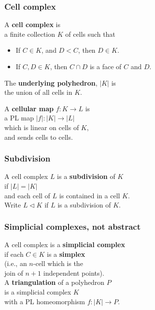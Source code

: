 \documentclass[14pt]{beamer}
\newcommand{\subdivided}{\triangleleft}
\begin{document}
\begin{frame}
\frametitle{Cell complex}

 A \textbf{cell complex} is \\
  a finite collection $K$ of cells such that
  \begin{itemize}
  \item If $C \in K$, and $D < C$, then $D \in K$.
  \item If $C, D \in K$, then $C \cap D$ is a face of $C$ and $D$.
  \end{itemize}

  \vfill\pause
  The \textbf{underlying polyhedron}, $|K|$ is \\
  the union of all cells in $K$.

  \vfill\pause

  A \textbf{cellular map} $f : K \to L$ is \\
  a PL map $|f| : |K| \to |L|$ \\
  which is linear on cells of $K$, \\
  and sends cells to cells.

\end{frame}

\begin{frame}
\frametitle{Subdivision}

 A cell complex $L$ is a \textbf{subdivision} of $K$ \\
  if $|L| = |K|$ \\
  and each cell of $L$ is contained in a cell $K$. \\

  \vfill\pause
  Write $L \subdivided K$ if $L$ is a subdivision of $K$.

\end{frame}

\begin{frame}
\frametitle{Simplicial complexes, not abstract}

 A cell complex is a \textbf{simplicial complex} \\
  if each $C \in K$ is a \textbf{simplex} \\
  \quad (i.e., an $n$-cell which is the\\
  \quad\quad join of $n+1$ independent points).  \\
  \vfill
  A \textbf{triangulation} of a polyhedron $P$\\
  is a simplicial complex $K$ \\
  with a PL homeomorphism $f : |K| \to P$.

\end{frame}
\end{document}
